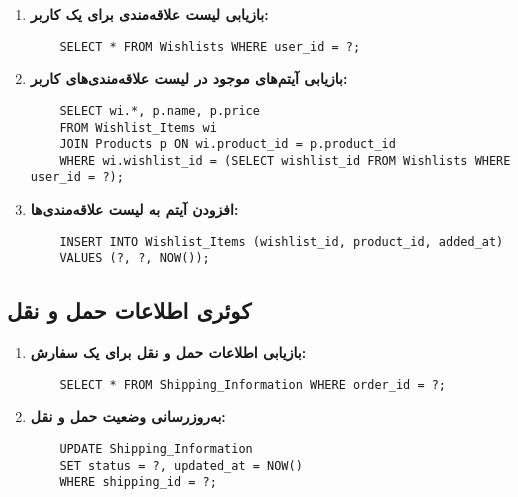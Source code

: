 \documentclass[12pt]{article}
\begin{document}
\begin{enumerate}
    \item \textbf{بازیابی لیست علاقه‌مندی برای یک کاربر:}
    \begin{latin}
    \begin{verbatim}
    SELECT * FROM Wishlists WHERE user_id = ?;
    \end{verbatim}
    \end{latin}
    
    \item \textbf{بازیابی آیتم‌های موجود در لیست علاقه‌مندی‌های کاربر:}
    \begin{latin}
    \begin{verbatim}
    SELECT wi.*, p.name, p.price
    FROM Wishlist_Items wi
    JOIN Products p ON wi.product_id = p.product_id
    WHERE wi.wishlist_id = (SELECT wishlist_id FROM Wishlists WHERE user_id = ?);
    \end{verbatim}
    \end{latin}
    
    \item \textbf{افزودن آیتم به لیست علاقه‌مندی‌ها:}
    \begin{latin}
    \begin{verbatim}
    INSERT INTO Wishlist_Items (wishlist_id, product_id, added_at)
    VALUES (?, ?, NOW());
    \end{verbatim}
    \end{latin}
\end{enumerate}

\subsection{کوئری اطلاعات حمل و نقل}

\begin{enumerate}
    \item \textbf{بازیابی اطلاعات حمل و نقل برای یک سفارش:}
    \begin{latin}
    \begin{verbatim}
    SELECT * FROM Shipping_Information WHERE order_id = ?;
    \end{verbatim}
    \end{latin}
    
    \item \textbf{به‌روزرسانی وضعیت حمل و نقل:}
    \begin{latin}
    \begin{verbatim}
    UPDATE Shipping_Information
    SET status = ?, updated_at = NOW()
    WHERE shipping_id = ?;
    \end{verbatim}
    \end{latin}
\end{enumerate}
\end{document}
